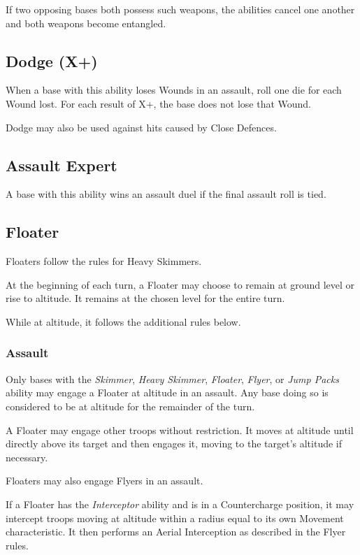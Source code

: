If two opposing bases both possess such weapons, the abilities cancel one another and both weapons become entangled.

\subsection{Dodge (X+)}

When a base with this ability loses Wounds in an assault, roll one die for each Wound lost. For each result of X+, the base does not lose that Wound.

Dodge may also be used against hits caused by Close Defences.

\subsection{Assault Expert}

A base with this ability wins an assault duel if the final assault roll is tied.

\subsection{Floater}

Floaters follow the rules for Heavy Skimmers.

At the beginning of each turn, a Floater may choose to remain at ground level or rise to altitude. It remains at the chosen level for the entire turn.

While at altitude, it follows the additional rules below.

\subsubsection{Assault}

Only bases with the \textit{Skimmer}, \textit{Heavy Skimmer}, \textit{Floater}, \textit{Flyer}, or \textit{Jump Packs} ability may engage a Floater at altitude in an assault. Any base doing so is considered to be at altitude for the remainder of the turn.

A Floater may engage other troops without restriction. It moves at altitude until directly above its target and then engages it, moving to the target's altitude if necessary.

Floaters may also engage Flyers in an assault.

If a Floater has the \textit{Interceptor} ability and is in a Countercharge position, it may intercept troops moving at altitude within a radius equal to its own Movement characteristic. It then performs an Aerial Interception as described in the Flyer rules.

